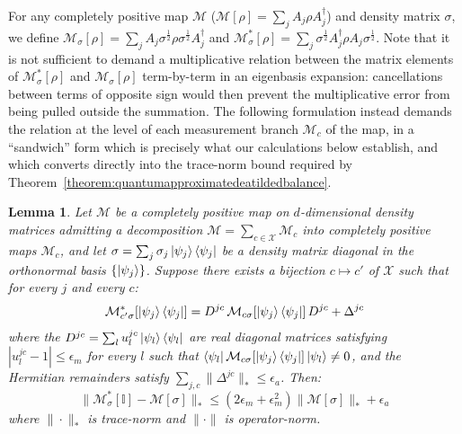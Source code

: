 \documentclass[aps,floatfix,10pt,amssymb,amsfont,amsmath,superscriptaddress,float,nofootinbib,longbibliography,nobalancelastpage,twocolumn]{revtex4-2}
\newtheorem{lemma}{Lemma}
\begin{document}
For any completely positive map $\mathcal{M}$ ($\mathcal{M}[\rho] =\sum_{j}  A_{j}\rho  A^{\dagger}_{j}$) and density matrix $\sigma$, we define $\mathcal{M}_{\sigma}[\rho] =\sum_{j}  A_{j}\sigma^{\frac{1}{2}}\rho\sigma^{\frac{1}{2}}  A^{\dagger}_{j}$ and $ \mathcal{M}^*_{\sigma}[\rho] = \sum_{j} \sigma^{\frac{1}{2}}A^{\dagger}_{j}\rho A_{j}\sigma^{\frac{1}{2}}$. Note that it is not sufficient to demand a multiplicative relation between the matrix elements of $\mathcal{M}^*_{\sigma}[\rho]$ and $\mathcal{M}_{\sigma}[\rho]$ term-by-term in an eigenbasis expansion: cancellations between terms of opposite sign would then prevent the multiplicative error from being pulled outside the summation. The following formulation instead demands the relation at the level of each measurement branch $\mathcal{M}_c$ of the map, in a ``sandwich'' form which is precisely what our calculations below establish, and which converts directly into the trace-norm bound required by Theorem~\ref{theorem:quantumapproximatedeatildedbalance}.
\begin{lemma}
\label{lemma:1}
Let $\mathcal{M}$ be a completely positive map on $d$-dimensional density matrices admitting a decomposition $\mathcal{M} = \sum_{c\in\mathcal{X}} \mathcal{M}_c$ into completely positive maps $\mathcal{M}_c$, and let $\sigma = \sum_j \sigma_j \ket{\psi_j}\bra{\psi_j}$ be a density matrix diagonal in the orthonormal basis $\{\ket{\psi_j}\}$. Suppose there exists a bijection $c \mapsto c'$ of $\mathcal{X}$ such that for every $j$ and every $c$:
\begin{equation}
    \mathcal{M}^*_{c'\sigma}[\ket{\psi_j}\bra{\psi_j}] = D^{jc}\,\mathcal{M}_{c\sigma}[\ket{\psi_j}\bra{\psi_j}]\,D^{jc} + \Delta^{jc}
    \label{eq:approximate_quantum_detailed_balance_condition}
\end{equation}
where the $D^{jc} = \sum_l u^{jc}_l\ket{\psi_l}\bra{\psi_l}$ are real diagonal matrices satisfying $|u^{jc}_l - 1| \leq \epsilon_m$ for every $l$ such that $\bra{\psi_l}\mathcal{M}_{c\sigma}[\ket{\psi_j}\bra{\psi_j}]\ket{\psi_l} \neq 0$, and the Hermitian remainders satisfy $\sum_{j,c}\|\Delta^{jc}\|_* \leq \epsilon_a$. Then:
 \begin{equation}
    \|\mathcal{M}^*_{\sigma}[\mathbb{I}]-\mathcal{M}[\sigma] \|_* \leq (2\epsilon_m+\epsilon_m^2)\|\mathcal{M}[\sigma]\|_* + \epsilon_a
\end{equation}
where $\|\cdot\|_*$ is trace-norm and $\|\cdot\|$ is operator-norm.
\end{lemma}
\end{document}
